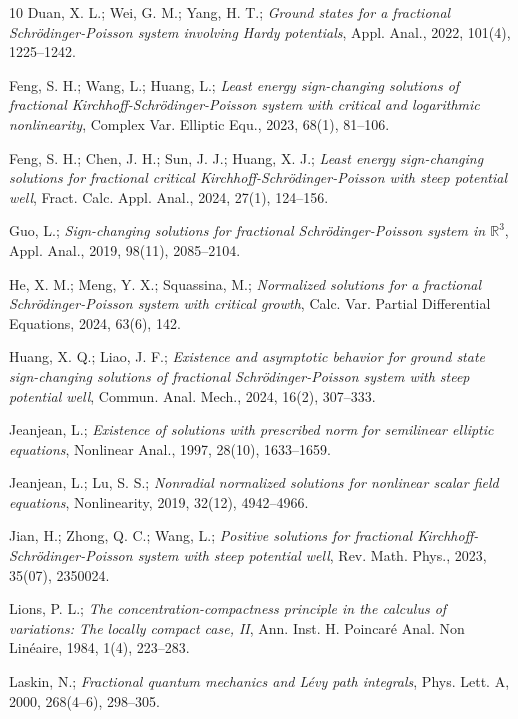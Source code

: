 \documentclass[reqno]{amsart}
\begin{document}
\begin{thebibliography}{10}
  Duan, X. L.; Wei, G. M.; Yang, H. T.;
\emph{Ground states for a fractional Schr\"odinger-Poisson system involving 
Hardy potentials}, Appl. Anal., 2022, 101(4), 1225--1242.

  Feng, S. H.; Wang, L.; Huang, L.;
\emph{Least energy sign-changing solutions of fractional Kirchhoff-Schr\"odinger-Poisson 
system with critical and logarithmic nonlinearity}, 
Complex Var. Elliptic Equ., 2023,  68(1), 81--106.

  Feng, S. H.;  Chen, J. H.; Sun, J. J.; Huang, X. J.;
\emph{Least energy sign-changing solutions for fractional critical 
Kirchhoff-Schr\"odinger-Poisson with steep potential well},
 Fract. Calc. Appl. Anal., 2024, 27(1), 124--156.

  Guo, L.;
\emph{Sign-changing solutions for fractional Schr\"odinger-Poisson system in
 $\mathbb{R}^3$}, Appl. Anal., 2019, 98(11), 2085--2104.

 He, X. M.; Meng, Y. X.; Squassina, M.;
\emph{Normalized solutions for a fractional Schr\"odinger-Poisson system with 
critical growth}, Calc. Var. Partial Differential Equations, 2024,  63(6), 142.

 Huang, X. Q.; Liao, J. F.;
\emph{Existence and asymptotic behavior for ground state sign-changing solutions 
of fractional Schr\"odinger-Poisson system with steep potential well},
Commun. Anal. Mech., 2024, 16(2), 307--333.

  Jeanjean, L.;
\emph{Existence of solutions with prescribed norm for semilinear elliptic equations},
Nonlinear Anal., 1997,  28(10), 1633--1659.

 Jeanjean, L.; Lu, S. S.;
\emph{Nonradial normalized solutions for nonlinear scalar field equations},
Nonlinearity, 2019, 32(12), 4942--4966.

  Jian, H.; Zhong, Q. C.; Wang, L.;
\emph{Positive solutions for fractional Kirchhoff-Schr\"odinger-Poisson system with 
steep potential well},  Rev. Math. Phys.,  2023, 35(07), 2350024.

 Lions, P. L.;
\emph{The concentration-compactness principle in the calculus of variations:
The locally compact case, II},
Ann. Inst. H. Poincar\'e Anal. Non Lin\'eaire, 1984,  1(4), 223--283.

   Laskin, N.;
\emph{Fractional quantum mechanics and L\'evy path integrals},
Phys. Lett. A, 2000,  268(4--6), 298--305.


\end{thebibliography}
\end{document}
